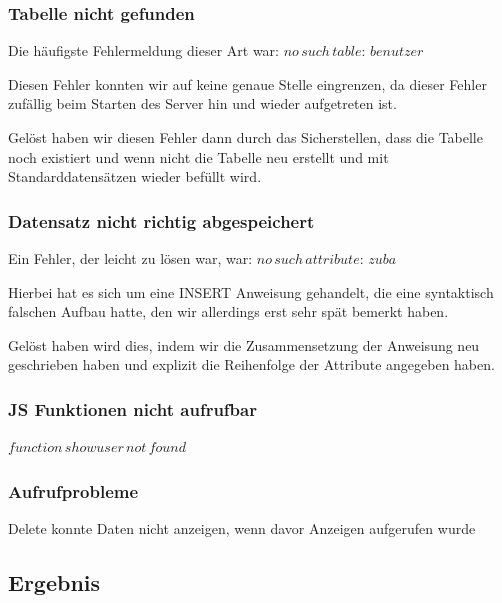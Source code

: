 \subsubsection{Tabelle nicht gefunden}
Die häufigste Fehlermeldung dieser Art war: $ no\,such\,table:\,benutzer $ 

Diesen Fehler konnten wir auf keine genaue Stelle eingrenzen, da dieser Fehler zufällig beim Starten des Server hin und wieder aufgetreten ist. 

Gelöst haben wir diesen Fehler dann durch das Sicherstellen, dass die Tabelle noch existiert und wenn nicht die Tabelle neu erstellt und mit Standarddatensätzen wieder befüllt wird.

\subsubsection{Datensatz nicht richtig abgespeichert}
Ein Fehler, der leicht zu lösen war, war: $ no\,such\,attribute:\,zuba $ 

Hierbei hat es sich um eine INSERT Anweisung gehandelt, die eine syntaktisch falschen Aufbau hatte, den wir allerdings erst sehr spät bemerkt haben. 

Gelöst haben wird dies, indem wir die Zusammensetzung der Anweisung neu geschrieben haben und explizit die Reihenfolge der Attribute angegeben haben.

\subsubsection{JS Funktionen nicht aufrufbar}$ function\,showuser\,not\,found $ 

\subsubsection{Aufrufprobleme}Delete konnte Daten nicht anzeigen, wenn davor Anzeigen aufgerufen wurde


\subsection{Ergebnis}
